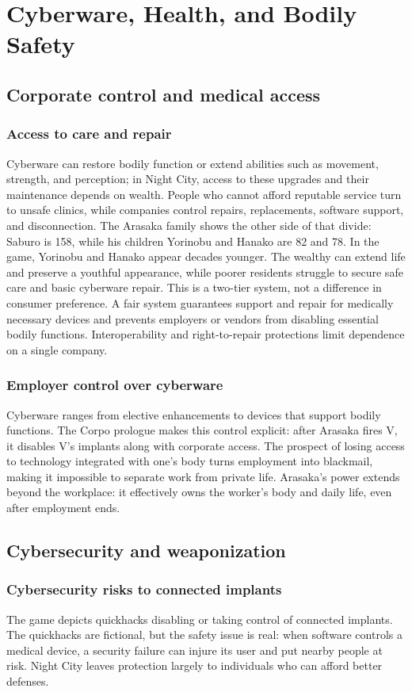 \documentclass{article}%
\begin{document}
\section{Cyberware, Health, and Bodily Safety}
\subsection{Corporate control and medical access}
\subsubsection{Access to care and repair}
Cyberware can restore bodily function or extend abilities such as movement, strength, and perception; in Night City, access to these upgrades and their maintenance depends on wealth. People who cannot afford reputable service turn to unsafe clinics, while companies control repairs, replacements, software support, and disconnection. The Arasaka family shows the other side of that divide: Saburo is 158, while his children Yorinobu and Hanako are 82 and 78. In the game, Yorinobu and Hanako appear decades younger. The wealthy can extend life and preserve a youthful appearance, while poorer residents struggle to secure safe care and basic cyberware repair. This is a two-tier system, not a difference in consumer preference. A fair system guarantees support and repair for medically necessary devices and prevents employers or vendors from disabling essential bodily functions. Interoperability and right-to-repair protections limit dependence on a single company.

\subsubsection{Employer control over cyberware}
Cyberware ranges from elective enhancements to devices that support bodily functions. The Corpo prologue makes this control explicit: after Arasaka fires V, it disables V's implants along with corporate access. The prospect of losing access to technology integrated with one's body turns employment into blackmail, making it impossible to separate work from private life. Arasaka's power extends beyond the workplace: it effectively owns the worker's body and daily life, even after employment ends.

\subsection{Cybersecurity and weaponization}
\subsubsection{Cybersecurity risks to connected implants}
The game depicts quickhacks disabling or taking control of connected implants. The quickhacks are fictional, but the safety issue is real: when software controls a medical device, a security failure can injure its user and put nearby people at risk. Night City leaves protection largely to individuals who can afford better defenses.
\end{document}
